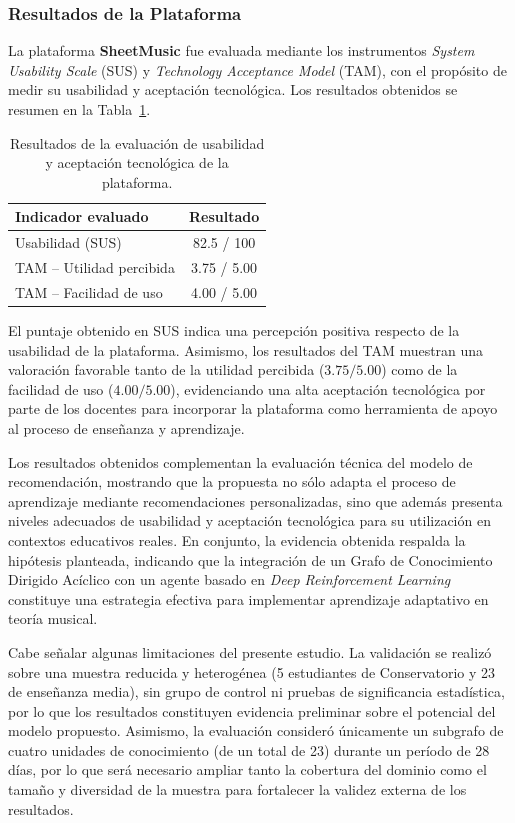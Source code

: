 \documentclass[conference]{IEEEtran}
\begin{document}
\subsubsection{Resultados de la Plataforma}

La plataforma \textbf{SheetMusic} fue evaluada mediante los instrumentos \textit{System Usability Scale} (SUS) y \textit{Technology Acceptance Model} (TAM), con el propósito de medir su usabilidad y aceptación tecnológica. Los resultados obtenidos se resumen en la Tabla~\ref{tab:sus_tam}.

\begin{table}[htbp]
\centering
\caption{Resultados de la evaluación de usabilidad y aceptación tecnológica de la plataforma.}
\label{tab:sus_tam}
\begin{tabular}{lc}
\hline
\textbf{Indicador evaluado} & \textbf{Resultado} \\
\hline
Usabilidad (SUS) & 82.5 / 100 \\
TAM -- Utilidad percibida & 3.75 / 5.00 \\
TAM -- Facilidad de uso & 4.00 / 5.00 \\
\hline
\end{tabular}
\end{table}

El puntaje obtenido en SUS indica una percepción positiva respecto de la usabilidad de la plataforma. Asimismo, los resultados del TAM muestran una valoración favorable tanto de la utilidad percibida ($3.75/5.00$) como de la facilidad de uso ($4.00/5.00$), evidenciando una alta aceptación tecnológica por parte de los docentes para incorporar la plataforma como herramienta de apoyo al proceso de enseñanza y aprendizaje.

Los resultados obtenidos complementan la evaluación técnica del modelo de recomendación, mostrando que la propuesta no sólo adapta el proceso de aprendizaje mediante recomendaciones personalizadas, sino que además presenta niveles adecuados de usabilidad y aceptación tecnológica para su utilización en contextos educativos reales. En conjunto, la evidencia obtenida respalda la hipótesis planteada, indicando que la integración de un Grafo de Conocimiento Dirigido Acíclico con un agente basado en \textit{Deep Reinforcement Learning} constituye una estrategia efectiva para implementar aprendizaje adaptativo en teoría musical.

Cabe señalar algunas limitaciones del presente estudio. La validación se realizó sobre una muestra reducida y heterogénea (5 estudiantes de Conservatorio y 23 de enseñanza media), sin grupo de control ni pruebas de significancia estadística, por lo que los resultados constituyen evidencia preliminar sobre el potencial del modelo propuesto. Asimismo, la evaluación consideró únicamente un subgrafo de cuatro unidades de conocimiento (de un total de 23) durante un período de 28 días, por lo que será necesario ampliar tanto la cobertura del dominio como el tamaño y diversidad de la muestra para fortalecer la validez externa de los resultados.
\end{document}
